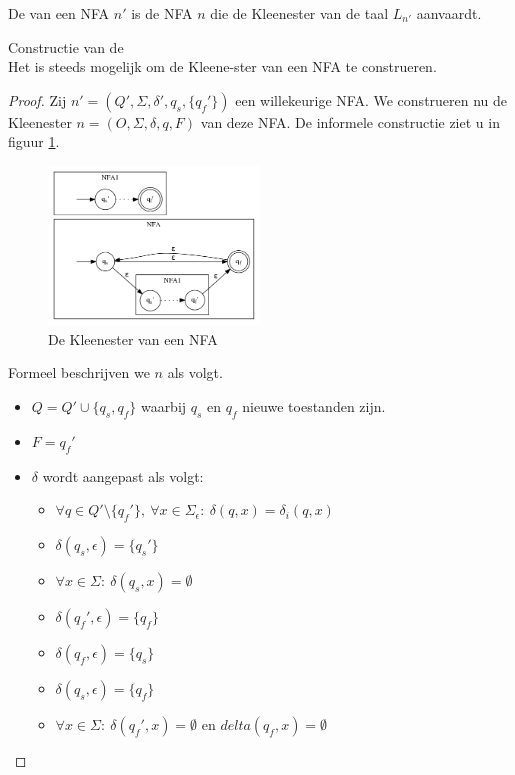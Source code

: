 \documentclass[main.tex]{subfiles}
\begin{document}
\begin{de}
  De  van een NFA $n'$ is de NFA $n$ die de Kleenester van de taal $L_{n'}$ aanvaardt.
\end{de}

\begin{st}
  Constructie van de \\
  Het is steeds mogelijk om de Kleene-ster van een NFA te construeren.

  \begin{proof}
    Zij $n' = (Q',\Sigma,\delta',q_{s},\{q_{f}'\})$ een willekeurige NFA. We construeren nu de Kleenester $n = (O,\Sigma,\delta,q,F)$ van deze NFA.
    De informele constructie ziet u in figuur \ref{fig:nfa_kleene}.
    \begin{figure}[H]
      \centering
      \includegraphics[width=0.5\textwidth]{assets/nfa_kleene.png}      
      \caption{De Kleenester van een NFA}
      \label{fig:nfa_kleene}
    \end{figure}
    Formeel beschrijven we $n$ als volgt.
    \begin{itemize}
    \item $Q = Q' \cup \{ q_{s}, q_{f} \}$ waarbij $q_{s}$ en $q_{f}$ nieuwe toestanden zijn.
    \item $F = {q_{f}'}$
    \item $\delta$ wordt aangepast als volgt:
      \begin{itemize}
      \item $\forall q \in Q'\setminus\{q_{f}'\},\ \forall x \in \Sigma_{\epsilon}:\ \delta(q,x) = \delta_{i}(q,x)$
      \item $\delta(q_{s},\epsilon) = \{q_{s}'\}$
      \item $\forall x \in \Sigma:\ \delta(q_{s},x) = \emptyset$
      \item $\delta(q_{f}',\epsilon) = \{q_{f}\}$
      \item $\delta(q_{f},\epsilon) = \{q_{s}\}$
      \item $\delta(q_{s},\epsilon) = \{q_{f}\}$
      \item $\forall x \in \Sigma:\ \delta(q_{f}',x) = \emptyset$ en $delta(q_{f},x) = \emptyset$
      \end{itemize}
    \end{itemize}
  \end{proof}
\end{st}
\end{document}
